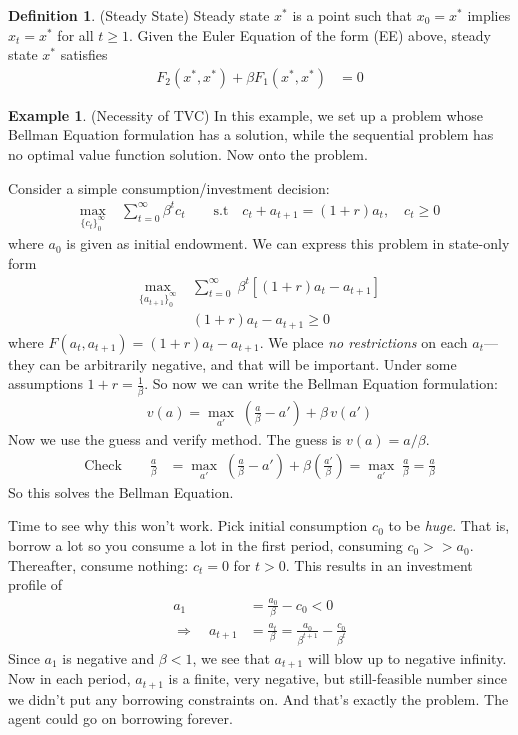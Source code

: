 \documentclass[12pt]{article}
\numberwithin{equation}{section} %
\theoremstyle{plain}
\theoremstyle{definition}
\newtheorem{defn}[thm]{Definition}
\newtheorem{ex}[thm]{Example}
\theoremstyle{remark}
\newcommand{\sumtinfz}{\sum^\infty_{t=0}}
\begin{document}
\begin{defn}(Steady State)
Steady state $x^*$ is a point such that $x_0=x^*$ implies $x_t=x^*$ for
all $t\geq 1$.
Given the Euler Equation of the form (EE) above, steady state $x^*$
satisfies
\begin{align*}
  F_2(x^*,x^*) + \beta F_1(x^*,x^*)
  &= 0
\end{align*}
\end{defn}


\clearpage
\begin{ex}{(Necessity of TVC)}
In this example, we set up a problem whose Bellman Equation formulation
has a solution, while the sequential problem has no optimal value
function solution. Now onto the problem.

Consider a simple consumption/investment decision:
\begin{align*}
  \max_{\{c_t\}_0^\infty} \; &\sumtinfz \beta^t c_t
  \qquad
  \text{s.t}\quad
  c_t + a_{t+1} = (1+r)a_t
  ,\quad
  c_t \geq 0
\end{align*}
where $a_0$ is given as initial endowment. We can express this problem
in state-only form
\begin{align*}
  \max_{\{a_{t+1}\}_0^\infty} \;
  &\sumtinfz \; \beta^t [(1+r)a_t - a_{t+1}] \\
  & (1+r)a_t - a_{t+1} \geq 0
\end{align*}
where $F(a_t,a_{t+1}) = (1+r)a_t - a_{t+1}$.
We place \emph{no restrictions} on each $a_t$---they can be arbitrarily
negative, and that will be important.
Under some assumptions $1+r = \frac{1}{\beta}$.
So now we can write the Bellman Equation formulation:
\begin{align*}
  v(a) = \max_{a'} \; \left(\frac{a}{\beta} - a'\right) + \beta \, v(a')
\end{align*}
Now we use the guess and verify method. The guess is $v(a) = a/\beta$.
\begin{align*}
  \text{Check} \qquad
  \frac{a}{\beta}
  &= \max_{a'} \;
  \left(\frac{a}{\beta} - a'\right)
  + \beta \left(\frac{a'}{\beta}\right)
  =
  \max_{a'} \;
  \frac{a}{\beta}
  =
  \frac{a}{\beta}
\end{align*}
So this solves the Bellman Equation.

Time to see why this won't work. Pick initial consumption $c_0$ to be
\emph{huge}. That is, borrow a lot so you consume a lot in the first
period, consuming $c_0 >> a_0$.
Thereafter, consume nothing: $c_t=0$ for $t>0$. This results in an
investment profile of
\begin{align*}
  a_{1} &= \frac{a_0}{\beta} - c_0 < 0 \\
  \Rightarrow \quad
  a_{t+1} &= \frac{a_t}{\beta}
  = \frac{a_0}{\beta^{t+1}} - \frac{c_0}{\beta^t}
\end{align*}
Since $a_1$ is negative and $\beta<1$, we see that $a_{t+1}$ will blow
up to negative infinity.
Now in each period, $a_{t+1}$ is a finite, very negative, but
still-feasible number since we didn't put any borrowing constraints on.
And that's exactly the problem. The agent could go on borrowing forever.


\end{ex}
\end{document}
